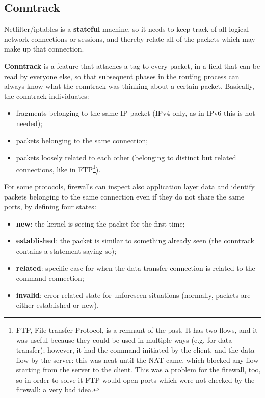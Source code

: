 
\subsection{Conntrack}
\label{sec:conntrack}
Netfilter/iptables is a \textbf{stateful} machine, so it needs to keep track of all logical network connections or sessions, and thereby relate all of the packets which may make up that connection.

\textbf{Conntrack} is a feature that attaches a tag to every packet, in a field that can be read by everyone else, so that subsequent phases in the routing process can always know what the conntrack was thinking about a certain packet. Basically, the conntrack individuates:

\begin{itemize}
    \item fragments belonging to the same IP packet (IPv4 only, as in IPv6 this is not needed);
    \item packets belonging to the same connection;
    \item packets loosely related to each other (belonging to distinct but related connections, like in FTP\footnote{FTP, File transfer Protocol, is a remnant of the past. It has two flows, and it was useful because they could be used in multiple ways (e.g. for data transfer); however, it had the command initiated by the client, and the data flow by the server: this was neat until the NAT came, which blocked any flow starting from the server to the client. This was a problem for the firewall, too, so in order to solve it FTP would open ports which were not checked by the firewall: a very bad idea.}).
\end{itemize}

For some protocols, firewalls can inspect also application layer data and identify packets belonging to the same connection even if they do not share the same ports, by defining four states:

\begin{itemize}
    \item \textbf{new}: the kernel is seeing the packet for the first time;
    \item \textbf{established}: the packet is similar to something already seen (the conntrack contains a statement saying so);
    \item \textbf{related}: specific case for when the data transfer connection is related to the command connection;
    \item \textbf{invalid}: error-related state for unforeseen situations (normally, packets are either established or new).
\end{itemize}

